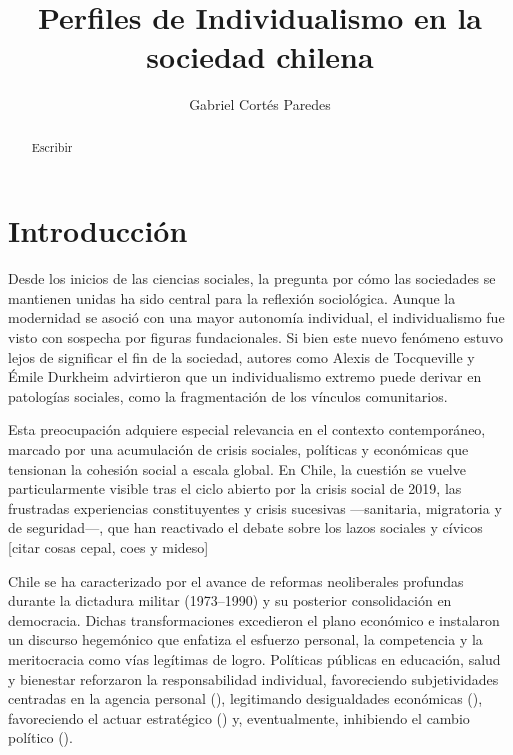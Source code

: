 \documentclass[
  letterpaper,
  DIV=11,
  numbers=noendperiod]{scrartcl}
\title{Perfiles de Individualismo en la sociedad chilena}
\author{Gabriel Cortés Paredes}
\date{}
\begin{document}
\maketitle
\begin{abstract}
Escribir
\end{abstract}


\section{Introducción}\label{introducciuxf3n}

Desde los inicios de las ciencias sociales, la pregunta por cómo las
sociedades se mantienen unidas ha sido central para la reflexión
sociológica. Aunque la modernidad se asoció con una mayor autonomía
individual, el individualismo fue visto con sospecha por figuras
fundacionales. Si bien este nuevo fenómeno estuvo lejos de significar el
fin de la sociedad, autores como Alexis de Tocqueville y Émile Durkheim
advirtieron que un individualismo extremo puede derivar en patologías
sociales, como la fragmentación de los vínculos comunitarios.

Esta preocupación adquiere especial relevancia en el contexto
contemporáneo, marcado por una acumulación de crisis sociales, políticas
y económicas que tensionan la cohesión social a escala global. En Chile,
la cuestión se vuelve particularmente visible tras el ciclo abierto por
la crisis social de 2019, las frustradas experiencias constituyentes y
crisis sucesivas ---sanitaria, migratoria y de seguridad---, que han
reactivado el debate sobre los lazos sociales y cívicos {[}citar cosas
cepal, coes y mideso{]}

Chile se ha caracterizado por el avance de reformas neoliberales
profundas durante la dictadura militar (1973--1990) y su posterior
consolidación en democracia. Dichas transformaciones excedieron el plano
económico e instalaron un discurso hegemónico que enfatiza el esfuerzo
personal, la competencia y la meritocracia como vías legítimas de logro.
Políticas públicas en educación, salud y bienestar reforzaron la
responsabilidad individual, favoreciendo subjetividades centradas en la
agencia personal (),
legitimando desigualdades económicas
(), favoreciendo el
actuar estratégico () y, eventualmente, inhibiendo el cambio político
().
\end{document}
